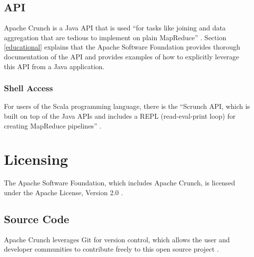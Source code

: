 \documentclass[9pt,twocolumn,twoside]{../../styles/osajnl}
\begin{document}
\subsection{API} \label{api}
Apache Crunch is a Java API that is used ``for tasks like joining and
data aggregation that are tedious to implement on plain MapReduce''
\cite{www-crunch-api}. Section \ref{educational}
explains that the
Apache Software Foundation provides thorough documentation of the API
and provides examples of how to explicitly leverage this API from a
Java application.

\subsubsection{Shell Access} \label{shell}
For users of the Scala programming language, there is the ``Scrunch
API, which is built on top of the Java APIs and includes a REPL
(read-eval-print loop) for creating MapReduce pipelines''
\cite{www-crunch-api}.

\section{Licensing} \label{licensing}
The Apache Software Foundation, which includes Apache Crunch, is
licensed under the Apache License, Version 2.0 \cite{www-apache-lic}.

\subsection{Source Code}\label{source}
Apache Crunch leverages Git \CE for version control, which allows the user
and developer communities to contribute freely to this open source
project \cite{www-crunch-git}.
\end{document}
